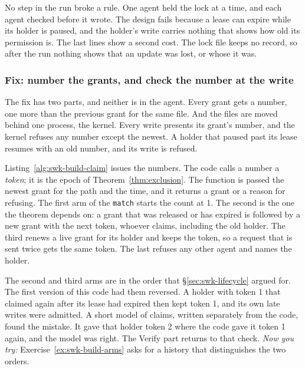No step in the run broke a rule. One agent held the lock at a time, and
each agent checked before it wrote. The design fails because a lease can
expire while its holder is paused, and the holder's write carries nothing
that shows how old its permission is. The last lines show a second cost. The
lock file keeps no record, so after the run nothing shows that an update was
lost, or whose it was.

\ifdefined\pdswisslandmarkplate
\begin{figure}[p]
  \centering
\end{figure}
\pdmarginpagebreak
\fi

\subsubsection{Fix: number the grants, and check the number at the write}

The fix has two parts, and neither is in the agent. Every grant gets a
number, one more than the previous grant for the same file. And the files
are moved behind one process, the kernel. Every write presents its grant's
number, and the kernel refuses any number except the newest. A holder that
paused past its lease resumes with an old number, and its write is refused.

Listing~\ref{alg:swk-build-claim} issues the numbers. The code calls a number a
\emph{token}; it is the epoch of Theorem~\ref{thm:exclusion}. The function is
passed the newest grant for the path and the time, and it returns a grant or
a reason for refusing. The first arm of the \texttt{match} starts the count
at 1. The second is the one the theorem depends on: a grant that was released
or has expired is followed by a new grant with the next token, whoever claims,
including the old holder. The third renews a live grant for its holder and
keeps the token, so a request that is sent twice gets the same token. The
last refuses any other agent and names the holder.


The second and third arms are in the order that \S\ref{sec:swk-lifecycle}
argued for. The first version of this code had them reversed. A
holder with token 1 that claimed again after its lease had expired then kept
token 1, and its own late writes were admitted. A short model of claims,
written separately from the code, found the mistake. It gave that holder token
2 where the code gave it token 1 again, and the model was right. The Verify
part returns to that check. \emph{Now you try:}
Exercise~\ref{ex:swk-build-arms} asks for a history that distinguishes the two
orders.

